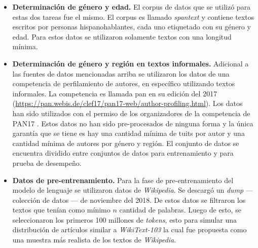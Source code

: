 \begin{itemize}

\item \textbf{Determinación de género y edad.} El corpus de datos que se utilizó para estas dos tareas fue el mismo. El corpus es llamado \textit{\gls{spantext}} \parencite{villegas:2014:CACIC} y contiene textos escritos por personas hispanohablantes, cada uno etiquetado con su género y edad. Para estos datos se utilizaron solamente textos con una longitud mínima.

\item \textbf{Determinación de género y región en textos informales.} Adicional a las fuentes de datos mencionadas arriba se utilizaron los datos de una competencia de perfilamiento de autores, en específico utilizando textos informales. La competencia es llamada \gls{pan} en su edición del 2017 (\url{https://pan.webis.de/clef17/pan17-web/author-profiling.html}). Los datos han sido utilizados con el permiso de los organizadores de la competencia de PAN17 \parencite{rangel2017proceedings}. Estos datos no han sido pre-procesados de ninguna forma y la única garantía que se tiene es hay una cantidad mínima de tuits por autor y una cantidad mínima de autores por género y región. El conjunto de datos se encuentra dividido entre conjuntos de datos para entrenamiento y para prueba de desempeño.

\item \textbf{Datos de pre-entrenamiento.} Para la fase de pre-entrenamiento del modelo de lenguaje se utilizaron datos de \textit{Wikipedia}. Se descargó un \textit{dump} --- colección de datos --- de noviembre del 2018. De estos datos se filtraron los textos que tenían como mínimo $n$ cantidad de palabras. Luego de esto, se seleccionaron los primeros 100 millones de \textit{tokens}, esto para simular una distribución de artículos similar a \textit{WikiText-103} \parencite{merity2016pointer} la cual fue propuesta como una muestra más realista de los textos de \textit{Wikipedia}.
\end{itemize}
